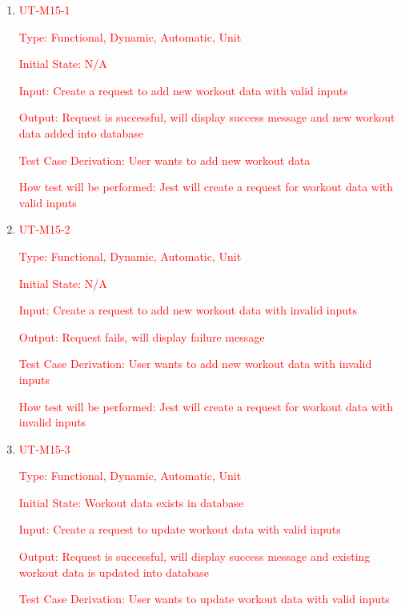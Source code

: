 \documentclass[12pt, titlepage]{article}
\begin{document}
\begin{enumerate}

	\item{\textcolor{red}{UT-M15-1\\}}

	\textcolor{red}{Type: Functional, Dynamic, Automatic, Unit}

	\textcolor{red}{Initial State: N/A}

	\textcolor{red}{Input: Create a request to add new workout data with valid inputs}

	\textcolor{red}{Output: Request is successful, will display success message and new workout data added into database}

	\textcolor{red}{Test Case Derivation: User wants to add new workout data}

	\textcolor{red}{How test will be performed: Jest will create a request for workout data with valid inputs}

	\item{\textcolor{red}{UT-M15-2\\}}

	\textcolor{red}{Type: Functional, Dynamic, Automatic, Unit}

	\textcolor{red}{Initial State: N/A}

	\textcolor{red}{Input: Create a request to add new workout data with invalid inputs}

	\textcolor{red}{Output: Request fails, will display failure message}

	\textcolor{red}{Test Case Derivation: User wants to add new workout data with invalid inputs}

	\textcolor{red}{How test will be performed: Jest will create a request for workout data with invalid inputs}

        \item{\textcolor{red}{UT-M15-3\\}}

	\textcolor{red}{Type: Functional, Dynamic, Automatic, Unit}

	\textcolor{red}{Initial State: Workout data exists in database}

	\textcolor{red}{Input: Create a request to update workout data with valid inputs}

	\textcolor{red}{Output: Request is successful, will display success message and existing workout data is updated into database}

	\textcolor{red}{Test Case Derivation: User wants to update workout data with valid inputs}


\end{enumerate}
\end{document}
